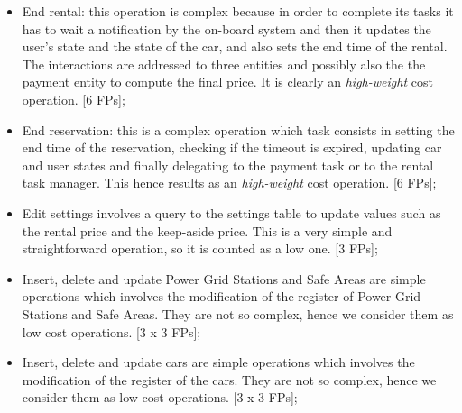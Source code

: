 \documentclass{scrreprt}
\begin{document}
\begin{itemize}
\item End rental: this operation is complex because in order to complete its tasks it has to wait a notification by the on-board system and then it updates the user's state and the state of the car, and also sets the end time of the rental. The interactions are addressed to three entities and possibly also the the payment entity to compute the final price. It is clearly an \emph{high-weight} cost operation. [6 FPs];

\item End reservation: this is a complex operation which task consists in setting the end time of the reservation, checking if the timeout is expired, updating car and user states and finally delegating to the payment task or to the rental task manager.
This hence results as an \emph{high-weight} cost operation. [6 FPs];

\item Edit settings involves a query to the settings table to update values such as the rental price and the keep-aside price. This is a very simple and straightforward operation, so it is counted as a low one. [3 FPs];

\item Insert, delete and update Power Grid Stations and Safe Areas are simple operations which involves the modification of the register of Power Grid Stations and Safe Areas. They are not so complex, hence we consider them as low cost operations. [3 x 3 FPs];

\item  Insert, delete and update cars are simple operations which involves the modification of the register of the cars. They are not so complex, hence we consider them as low cost operations. [3 x 3 FPs];


\end{itemize}
\end{document}
